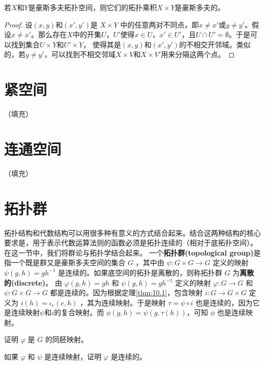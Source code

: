 \begin{theorem}
\begin{theorem}
\begin{theorem}\label{eg:10.7}
	若$X$和$Y$是豪斯多夫拓扑空间，则它们的拓扑乘积$X\times Y$是豪斯多夫的。
\end{theorem}

\begin{proof}
	设$(x,y)$和$(x',y')$是 $X\times Y$ 中的任意两对不同点，即$x\neq x'$或$y\neq y'$。假设$x\neq x'$。那么存在$X$中的开集$U$，$U'$使得$x\in U$，$x'\in U'$，且$U\cap U'=\emptyset $。于是可以找到集合$U\times Y$和$U'\times Y$， 使得其是$(x,y)$和$(x',y')$的不相交开邻域。类似的，若$y\neq y'$，可以找到不相交邻域$X\times V$和$X\times V'$用来分隔这两个点。
\end{proof}

\section{紧空间}
（填充）
\section{连通空间}
（填充）
\section{拓扑群}

拓扑结构和代数结构可以用很多种有意义的方式结合起来。结合这两种结构的核心要求是，用于表示代数运算法则的函数必须是拓扑连续的（相对于底拓扑空间）。在这一节中，我们将群论与拓扑学结合起来。
	一个\textbf{拓扑群(topological group)}是指一个既是群又是豪斯多夫空间的集合 $ G$ ，其中由 $\psi :G\times G\rightarrow G$ 定义的映射 $\psi (g,h)=gh^{-1}$ 是连续的。如果底空间的拓扑是离散的，则称拓扑群 $G$ 为\textbf{离散的(discrete)}。
	由 $\varphi (g,h)=gh$ 和 $\psi (g,h)=gh^{-1}$ 定义的映射 $\varphi :G\rightarrow G$ 和 $\psi :G\times G\rightarrow G$ 都是连续的。因为根据定理\ref{thm:10.1}，包含映射 $i:G\rightarrow G\times G$ 定义为 $i(h)=\iota _{e} (e,h)$ ，其为连续映射。于是映射 $\tau =\psi \circ i$ 也是连续的，因为它是连续映射$ \psi $和$ i$的复合映射。而 $\phi ( g,h) =\psi (g,\tau (h))$，可知 $\phi $ 也是连续映射。

\begin{exercise}
	证明 $\varphi $ 是 $G$ 的同胚映射。
\end{exercise}

\begin{exercise}
	如果 $\varphi $ 和 $\psi $ 是连续映射，证明 $\varphi $ 是连续的。
\end{exercise}


\end{theorem}
\end{theorem}
